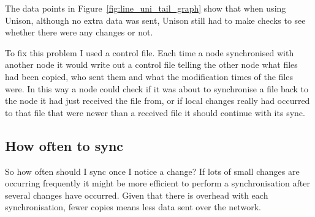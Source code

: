 \documentclass[12pt]{article}
\begin{document}
The data points in Figure~\ref{fig:line_uni_tail_graph} show that when using
Unison, although no extra data was sent, Unison still had to make checks to see
whether there were any changes or not.

To fix this problem I used a control file. Each time a node
synchronised with another node it would write out a control file telling
the other node what files had been copied, who sent them and what the
modification times of the files were. In this way a node could check
if it was about to synchronise a file back to the node it had just received
the file from, or if local changes really had occurred to that file
that were newer than a received file it should continue with its sync.

\subsection{How often to sync}
So how often should I sync once I notice a change?
If lots of small changes are occurring frequently it might be more efficient
to perform a synchronisation after several changes have occurred. Given that
there is overhead with each synchronisation, fewer copies means less data
sent over the network.
\end{document}
